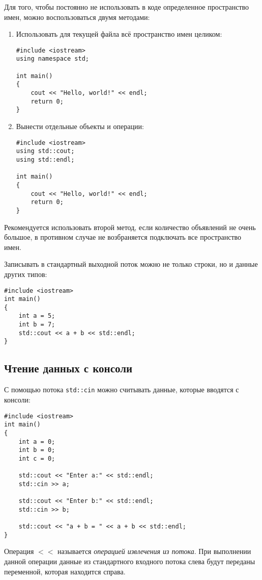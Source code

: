 Для того, чтобы постоянно не использовать в коде определенное пространство имен, можно воспользоваться двумя методами:
\begin{enumerate}
    \item Использовать для текущей файла всё пространство имен целиком:
    \begin{lstlisting}
#include <iostream>
using namespace std;

int main()
{
    cout << "Hello, world!" << endl;
    return 0;
}
    \end{lstlisting}

    \item Вынести отдельные объекты и операции:
    \begin{lstlisting}
#include <iostream>
using std::cout;
using std::endl;

int main()
{
    cout << "Hello, world!" << endl;
    return 0;
}
    \end{lstlisting}
\end{enumerate}

Рекомендуется использовать второй метод, если количество объявлений не очень большое, в противном случае не возбраняется подключать все пространство имен.

Записывать в стандартный выходной поток можно не только строки, но и данные других типов:

\begin{lstlisting}
#include <iostream>
int main()
{
    int a = 5;
    int b = 7;
    std::cout << a + b << std::endl;
}
\end{lstlisting}

\subsection{Чтение данных с консоли}

С помощью потока \lstinline|std::cin| можно считывать данные, которые вводятся с консоли:
\begin{lstlisting}
#include <iostream>
int main()
{
    int a = 0;
    int b = 0;
    int c = 0;

    std::cout << "Enter a:" << std::endl;
    std::cin >> a;

    std::cout << "Enter b:" << std::endl;
    std::cin >> b;

    std::cout << "a + b = " << a + b << std::endl;
}
\end{lstlisting}

Операция $<<$ называется \textit{операцией извлечения из потока}. При выполнении данной операции данные из стандартного входного потока слева будут переданы переменной, которая находится справа.

